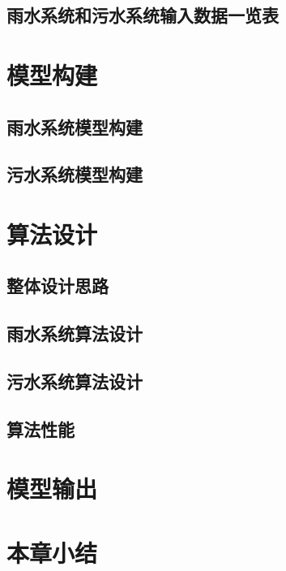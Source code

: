 \documentclass[degree=doctor]{thuthesis}
\begin{document}
\clearpage
\setcounter{page}{78}
\subsection{雨水系统和污水系统输入数据一览表}

\clearpage
\setcounter{page}{79}
\section{模型构建}
\subsection{雨水系统模型构建}

\clearpage
\setcounter{page}{85}
\subsection{污水系统模型构建}

\clearpage
\setcounter{page}{91}
\section{算法设计}
\subsection{整体设计思路}
\subsection{雨水系统算法设计}

\clearpage
\setcounter{page}{99}
\subsection{污水系统算法设计}

\clearpage
\setcounter{page}{105}
\subsection{算法性能}

\clearpage
\setcounter{page}{107}
\section{模型输出}

\clearpage
\setcounter{page}{108}
\section{本章小结}
\end{document}
